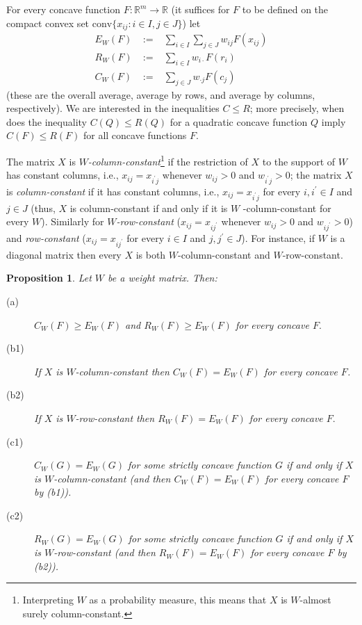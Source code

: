 \documentclass[12pt,a4paper,notitlepage]{article}
\newtheorem{proposition}[theorem]{Proposition}
\begin{document}
For every concave function $F:\mathbb{R}^{m}\rightarrow \mathbb{R}$ (it
suffices for $F$ to be defined on the compact convex set $\mathrm{conv}%
\{x_{ij}:i\in I,j\in J\}$) let%
\begin{eqnarray*}
E_{W}(F) &%
{\;:=\;}%
&\sum_{i\in I}\sum_{j\in J}w_{ij}F(x_{ij}) \\
R_{W}(F) &%
{\;:=\;}%
&\sum_{i\in I}w_{i\cdot }F(r_{i}) \\
C_{W}(F) &%
{\;:=\;}%
&\sum_{j\in J}w_{\cdot j}F(c_{j})
\end{eqnarray*}%
(these are the overall average, average by rows, and average by columns,
respectively). We are interested in the inequalities $C\leq R$; more
precisely, when does the inequality $C(Q)\leq R(Q)$ for a quadratic concave
function $Q$ imply $C(F)\leq R(F)$ for all concave functions $F$.

The matrix $X$ is $W$\emph{-column-constant}\footnote{%
Interpreting $W$ as a probability measure, this means that $X$ is $W$-almost
surely column-constant.} if the restriction of $X$ to the support of $W$ has
constant columns, i.e., $x_{ij}=x_{i^{\prime }j}$ whenever $w_{ij}>0$ and $%
w_{i^{\prime }j}>0$; the matrix $X$ is \emph{column-constant }if it has
constant columns, i.e., $x_{ij}=x_{i^{\prime }j}$ for every $i,i^{\prime
}\in I$ and $j\in J$ (thus, $X$ is column-constant if and only if it is $W$%
-column-constant for every $W$). Similarly for $W$\emph{-row-constant} ($%
x_{ij}=x_{ij^{\prime }}$ whenever $w_{ij}>0$ and $w_{ij^{\prime }}>0$) and 
\emph{row-constant} ($x_{ij}=x_{ij^{\prime }}$ for every $i\in I$ and $%
j,j^{\prime }\in J$). For instance, if $W$ is a diagonal matrix then every $X
$ is both $W$-column-constant and $W$-row-constant.

\begin{proposition}
\label{p:0}Let $W$ be a weight matrix. Then:

\begin{description}
\item[(a)] $C_{W}(F)\geq E_{W}(F)$ and $R_{W}(F)\geq E_{W}(F)$ for every
concave $F.$

\item[(b1)] If $X$ is $W$-column-constant then $C_{W}(F)=E_{W}(F)$ for every
concave $F$.

\item[(b2)] If $X$ is $W$-row-constant then $R_{W}(F)=E_{W}(F)$ for every
concave $F.$

\item[(c1)] $C_{W}(G)=E_{W}(G)$ for some \emph{strictly} concave function $G$
if and only if $X$ is $W$-column-constant (and then $C_{W}(F)=E_{W}(F)$ for
every concave $F$ by (b1)).

\item[(c2)] $R_{W}(G)=E_{W}(G)$ for some \emph{strictly} concave function $G$
if and only if $X$ is $W$-row-constant (and then $R_{W}(F)=E_{W}(F)$ for
every concave $F$ by (b2)).
\end{description}
\end{proposition}
\end{document}

